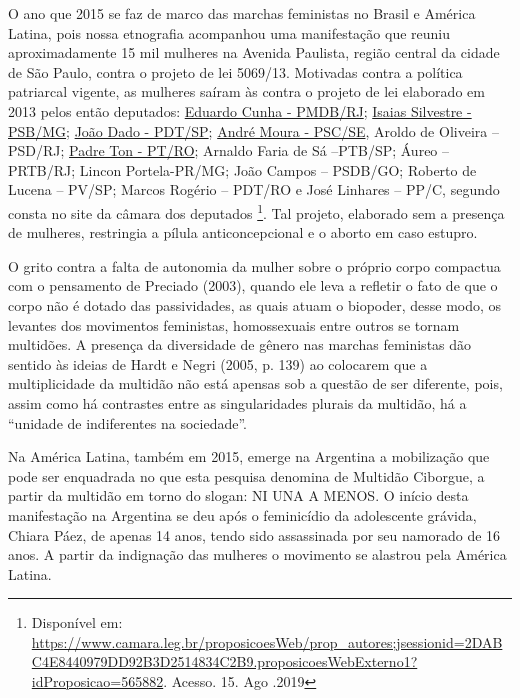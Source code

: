 O ano que 2015 se faz de marco das marchas feministas no Brasil e
América Latina, pois nossa etnografia acompanhou uma manifestação que
reuniu aproximadamente 15 mil mulheres na Avenida Paulista, região
central da cidade de São Paulo, contra o projeto de lei 5069/13.
Motivadas contra a política patriarcal vigente, as mulheres saíram às
contra o projeto de lei elaborado em 2013 pelos então deputados:
\href{https://www.camara.leg.br/deputados/74173}{Eduardo Cunha -
PMDB/RJ}; \href{https://www.camara.leg.br/deputados/74152}{Isaias
Silvestre - PSB/MG};
\href{https://www.camara.leg.br/deputados/73682}{João Dado - PDT/SP};
\href{https://www.camara.leg.br/deputados/160543}{André Moura - PSC/SE},
Aroldo de Oliveira -- PSD/RJ;
\href{https://www.camara.leg.br/deputados/160670}{Padre Ton - PT/RO};
Arnaldo Faria de Sá --PTB/SP; Áureo -- PRTB/RJ; Lincon Portela-PR/MG;
João Campos -- PSDB/GO; Roberto de Lucena -- PV/SP; Marcos Rogério --
PDT/RO e José Linhares -- PP/C, segundo consta no site da câmara dos
deputados \footnote{Disponível em:
  \url{https://www.camara.leg.br/proposicoesWeb/prop_autores;jsessionid=2DABC4E8440979DD92B3D2514834C2B9.proposicoesWebExterno1?idProposicao=565882}.
  Acesso. 15. Ago .2019}. Tal projeto, elaborado sem a presença de
mulheres, restringia a pílula anticoncepcional e o aborto em caso
estupro.

O grito contra a falta de autonomia da mulher sobre o próprio corpo
compactua com o pensamento de Preciado (2003), quando ele leva a
refletir o fato de que o corpo não é dotado das passividades, as quais
atuam o biopoder, desse modo, os levantes dos movimentos feministas,
homossexuais entre outros se tornam multidões. A presença da diversidade
de gênero nas marchas feministas dão sentido às ideias de Hardt e Negri
(2005, p. 139) ao colocarem que a multiplicidade da multidão não está
apensas sob a questão de ser diferente, pois, assim como há contrastes
entre as singularidades plurais da multidão, há a ``unidade de
indiferentes na sociedade''.

Na América Latina, também em 2015, emerge na Argentina a mobilização que
pode ser enquadrada no que esta pesquisa denomina de Multidão Ciborgue,
a partir da multidão em torno do slogan: NI UNA A MENOS. O início desta
manifestação na Argentina se deu após o feminicídio da adolescente
grávida, Chiara Páez, de apenas 14 anos, tendo sido assassinada por seu
namorado de 16 anos. A partir da indignação das mulheres o movimento se
alastrou pela América Latina.

